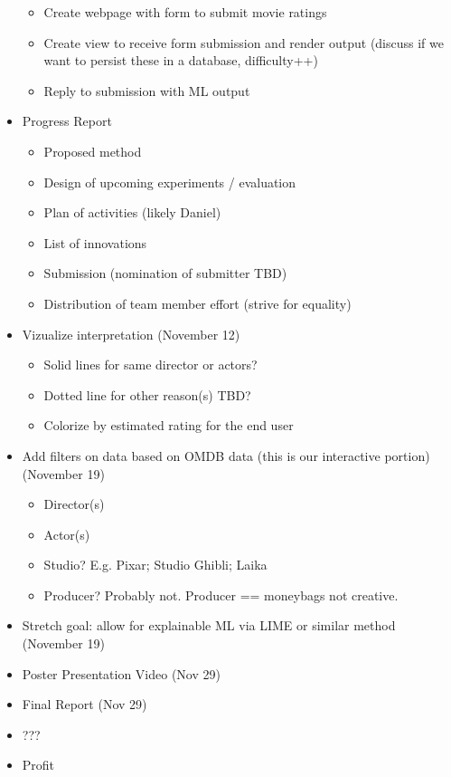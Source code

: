 \documentclass[sigchi, 12pt, nonacm=true, timestamp=true, screen=true]{acmart}
\begin{document}
\begin{itemize}
    \begin{itemize}
      \item Create webpage with form to submit movie ratings
      \item Create view to receive form submission and render output (discuss if we want to persist these in a database, difficulty++)
      \item Reply to submission with ML output
    \end {itemize}
  \item Progress Report
    \begin{itemize}
      \item Proposed method
      \item Design of upcoming experiments / evaluation
      \item Plan of activities (likely Daniel)
      \item List of innovations
      \item Submission (nomination of submitter TBD)
      \item Distribution of team member effort (strive for equality)
    \end{itemize}
  \item Vizualize interpretation (November 12)
    \begin{itemize}
      \item Solid lines for same director or actors?
      \item Dotted line for other reason(s) TBD?
      \item Colorize by estimated rating for the end user
    \end{itemize}
  \item Add filters on data based on OMDB data (this is our interactive portion) (November 19)
    \begin{itemize}
      \item Director(s)
      \item Actor(s)
      \item Studio? E.g. Pixar; Studio Ghibli; Laika
      \item Producer? Probably not. Producer == moneybags not creative.
    \end{itemize}
  \item Stretch goal: allow for explainable ML via LIME or similar method (November 19)
  \item Poster Presentation Video (Nov 29)
  \item Final Report (Nov 29)
  \item ???
  \item Profit
\end{itemize}






\end{document}
